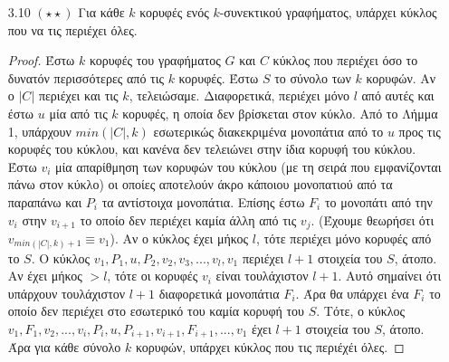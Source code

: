 \documentclass[a4paper, oneside, 11pt]{article}
\theoremstyle{definition}
\begin{document}
\begin{enumerate}
\begin{proof}
\begin{itemize}
               Έστω τώρα ότι $\{x, y\} \in E(G)$. Αν το γράφημα έχει μόνο
               3 κορυφές τότε είναι το $K_3$ και έχουμε τελειώσει.
               Διαφορετικά έστω ότι έχει τουλάχιστον άλλη μία κορυφή $w$
               η οποία συνδέεται στην $x$. Επειδή το γράφημα είναι δισυνεκτικό
               θα πρέπει η αφαίρεση της $x$ να μην το αποσυνδέει, συνεπώς
               θα πρέπει να υπάρχει μονοπάτι $P$ από την $w$ στην
               $y$ που να μην χρησιμοποιεί την κορυφή $x$. Tότε όμως
               μεταξύ της $x$ και της $y$ θα υπήραν 3 εσωτερικά διακεκριμένα
               μονοπάτια: 1) $(x, y)$, 2) $(x, u, y)$, 3) $P$. Άτοπο
               γιατί τώρα η αφαίρεση της $\{x, y\}$ διατηρεί το γράφημα
               δισυνεκτικό.\footnote{Υπάρχει περίπτωση το $P$ να χρησιμοποιεί
               την $u$ ώς ενδιάμεσο κόμβο. Σε αυτή την περίπτωση θεωρούμε
               το $P'$ από το $w$ στο $u$ και δείχνουμε ότι υπάρχουν
               3 εσωτερικά διακεκριμένα μονοπάτια από το $x$ στο $u$.}

               Άρα η $u$ είναι μη απλοϊδής κορυφή βαθμού 2 και μένει να
               δείξουμε ότι η διάλυσή της διατηρεί τη συνεκτικότητα. Αυτό
               προκύπτει από το θεώρημα Menger αφού ό,τι μονοπάτια υπήρχαν
               πριν μεταξύ κορυφών συνεχίζουν να υπάρχουν.
         \end{itemize}
      \end{proof}

   \item[3.10 $(\star\star)$]
Για κάθε $k$ κορυφές ενός $k$-συνεκτικού γραφήματος, υπάρχει κύκλος που να τις περιέχει όλες.
\begin{proof}
Έστω $k$ κορυφές του γραφήματος $G$ και $C$ κύκλος που περιέχει όσο το δυνατόν περισσότερες από τις $k$ κορυφές. Έστω $S$ το σύνολο των $k$ κορυφών. Αν ο $|C|$ περιέχει και τις $k$, τελειώσαμε. 
Διαφορετικά, περιέχει μόνο $l$ από αυτές και έστω $u$ μία από τις 
$k$ κορυφές, η οποία δεν 
βρίσκεται στον κύκλο. Από το Λήμμα 1, υπάρχουν $min(|C|,k)$ εσωτερικώς διακεκριμένα μονοπάτια από το $u$ προς τις κορυφές του κύκλου, και κανένα δεν τελειώνει στην ίδια κορυφή του κύκλου. Έστω $v_i$ μία
απαρίθμηση των κορυφών του κύκλου (με τη σειρά που εμφανίζονται πάνω στον κύκλο) οι οποίες αποτελούν άκρο κάποιου μονοπατιού από τα παραπάνω 
και $P_i$ τα αντίστοιχα μονοπάτια. Επίσης έστω $F_i$ το μονοπάτι από 
την $v_i$ στην $v_{i+1}$ το οποίο δεν περιέχει καμία άλλη από τις $v_j$. (Έχουμε θεωρήσει ότι $v_{min(|C|,k)+1}\equiv v_1$). Αν ο κύκλος έχει μήκος $l$, τότε περιέχει μόνο κορυφές από το $S$. Ο κύκλος
$v_1, P_1, u, P_2, v_2, v_3, ..., v_l, v_1$ περιέχει $l+1$ στοιχεία του $S$, άτοπο. Αν έχει μήκος $>l$, τότε οι κορυφές $v_i$ είναι τουλάχιστον $l+1$. Αυτό σημαίνει ότι υπάρχουν τουλάχιστον $l+1$
διαφορετικά μονοπάτια $F_i$. Άρα θα υπάρχει ένα $F_i$ το οποίο δεν περιέχει στο εσωτερικό του καμία κορυφή του $S$. Τότε, ο κύκλος $v_1, F_1, v_2, ..., v_i, P_i, u, P_{i+1}, v_{i+1}, F_{i+1}, ...,v_1$ 
έχει $l+1$ στοιχεία του $S$, άτοπο.
Άρα για κάθε σύνολο $k$ κορυφών, υπάρχει κύκλος που τις περιέχέι όλες.
\end{proof}


\end{enumerate}
\end{document}
